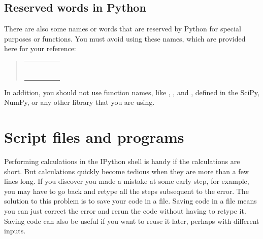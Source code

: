 \documentclass[letterpaper,10pt,english]{sphinxmanual}
\begin{document}
\subsection{Reserved words in Python}
\label{chap2/chap2_basics:index-15}\label{chap2/chap2_basics:reserved-words-in-python}
There are also some names or words that are reserved by Python for special purposes or functions.  You must avoid using these names, which are provided here for your reference:
\begin{quote}

\begin{tabulary}{\linewidth}{|L|L|L|L|L|}
\hline

 & 
 & 
 & 
 & 
\\

 & 
 & 
 & 
 & 
\\

 & 
 & 
 & 
 & 
\\

 & 
 & 
 & 
 & \\

 & 
 & 
 & 
 & \\

 & 
 & 
 & 
 & \\

 & 
 & 
 & 
 & \\
\hline\end{tabulary}

\end{quote}

In addition, you should not use function names, like , , and , defined in the SciPy, NumPy, or any other library that you are using.


\section{Script files and programs}
\label{chap2/chap2_basics:index-16}\label{chap2/chap2_basics:script-files-and-programs}
Performing calculations in the IPython shell is handy if the calculations are short.  But calculations quickly become tedious when they are more than a few lines long.  If you discover you made a mistake at some early step, for example, you may have to go back and retype all the steps subsequent to the error.  The solution to this problem is to save your code in a file.  Saving code in a file means you can just correct the error and rerun the code without having to retype it.  Saving code can also be useful if you want to reuse it later, perhaps with different inputs.
\end{document}
